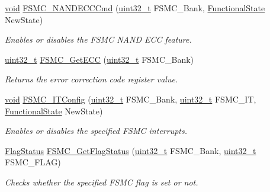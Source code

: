 \begin{DoxyCompactItemize}
\hyperlink{usb__devapi_8h_afabf60e7f57651d6d595a02c75f07cd0}{void} \hyperlink{group___f_s_m_c___private___functions_ga5800301fc39bbe998a18ebd9ff191cdc}{F\+S\+M\+C\+\_\+\+N\+A\+N\+D\+E\+C\+C\+Cmd} (\hyperlink{_p_e___types_8h_a33594304e786b158f3fb30289278f5af}{uint32\+\_\+t} F\+S\+M\+C\+\_\+\+Bank, \hyperlink{agilefox_2library_2inc_2stm32f10x__type_8h_ac9a7e9a35d2513ec15c3b537aaa4fba1}{Functional\+State} New\+State)
\begin{DoxyCompactList}\small\item\em Enables or disables the F\+S\+MC N\+A\+ND E\+CC feature. \end{DoxyCompactList}\item 
\hyperlink{_p_e___types_8h_a33594304e786b158f3fb30289278f5af}{uint32\+\_\+t} \hyperlink{group___f_s_m_c___private___functions_gaad6d4f5b5a41684ce053fea55bdb98d8}{F\+S\+M\+C\+\_\+\+Get\+E\+CC} (\hyperlink{_p_e___types_8h_a33594304e786b158f3fb30289278f5af}{uint32\+\_\+t} F\+S\+M\+C\+\_\+\+Bank)
\begin{DoxyCompactList}\small\item\em Returns the error correction code register value. \end{DoxyCompactList}\item 
\hyperlink{usb__devapi_8h_afabf60e7f57651d6d595a02c75f07cd0}{void} \hyperlink{group___f_s_m_c___private___functions_ga217027ae3cd213b9076b6a1be197064c}{F\+S\+M\+C\+\_\+\+I\+T\+Config} (\hyperlink{_p_e___types_8h_a33594304e786b158f3fb30289278f5af}{uint32\+\_\+t} F\+S\+M\+C\+\_\+\+Bank, \hyperlink{_p_e___types_8h_a33594304e786b158f3fb30289278f5af}{uint32\+\_\+t} F\+S\+M\+C\+\_\+\+IT, \hyperlink{agilefox_2library_2inc_2stm32f10x__type_8h_ac9a7e9a35d2513ec15c3b537aaa4fba1}{Functional\+State} New\+State)
\begin{DoxyCompactList}\small\item\em Enables or disables the specified F\+S\+MC interrupts. \end{DoxyCompactList}\item 
\hyperlink{agilefox_2library_2inc_2stm32f10x__type_8h_a89136caac2e14c55151f527ac02daaff}{Flag\+Status} \hyperlink{group___f_s_m_c___private___functions_gae00355115b078f483f0771057bb849c4}{F\+S\+M\+C\+\_\+\+Get\+Flag\+Status} (\hyperlink{_p_e___types_8h_a33594304e786b158f3fb30289278f5af}{uint32\+\_\+t} F\+S\+M\+C\+\_\+\+Bank, \hyperlink{_p_e___types_8h_a33594304e786b158f3fb30289278f5af}{uint32\+\_\+t} F\+S\+M\+C\+\_\+\+F\+L\+AG)
\begin{DoxyCompactList}\small\item\em Checks whether the specified F\+S\+MC flag is set or not. \end{DoxyCompactList}\item 

\end{DoxyCompactItemize}
